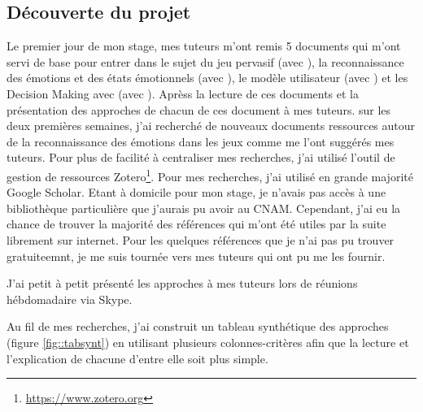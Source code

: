 \documentclass{article}
\begin{document}
	\subsection{Découverte du projet}
		Le premier jour de mon stage, mes tuteurs m'ont remis 5 documents qui m'ont servi de base pour entrer dans le sujet du jeu pervasif (avec \cite{gal_2019}), la reconnaissance des émotions et des états émotionnels (avec \cite{gal_2019,gizycka_et_al._2018,nalepa_et_al._2019}), le modèle utilisateur (avec \cite{alhudar_2019}) et les Decision Making avec (avec \cite{kornyshova_et_al._2010}).\newline
		Aprèss la lecture de ces documents et la présentation des approches de chacun de ces document à mes tuteurs. sur les deux premières semaines, j'ai recherché de nouveaux documents ressources autour de la reconnaissance des émotions dans les jeux comme me l'ont suggérés mes tuteurs. 
		Pour plus de facilité à centraliser mes recherches, j'ai utilisé l'outil de gestion de ressources Zotero\footnote{\href{https://www.zotero.org}{https://www.zotero.org}}. 
		Pour mes recherches, j'ai utilisé en grande majorité Google Scholar. 
		Etant à domicile pour mon stage, je n'avais pas accès à une bibliothèque particulière que j'aurais pu avoir au CNAM. 
		Cependant, j'ai eu la chance de trouver la majorité des références qui m'ont été utiles par la suite librement sur internet. 
		Pour les quelques références que je n'ai pas pu trouver gratuiteemnt, je me suis tournée vers mes tuteurs qui ont pu me les fournir.\par
		J'ai petit à petit présenté les approches à mes tuteurs lors de réunions hébdomadaire via Skype.\par
		Au fil de mes recherches, j'ai construit un tableau synthétique des approches (figure \ref{fig::tabsynt}) en utilisant plusieurs colonnes-critères afin que la lecture et l'explication de chacune d'entre elle soit plus simple.\par
\end{document}
